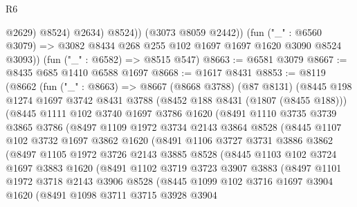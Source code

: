 \begin{lexlean}{R6}
\begin{coremodule}
                  @2629)
                @8524)
              @2634)
            @8524))
        (@3073 @8059 @2442))
      (fun ("_" : @6560 @3079) => @3082 @8434 @268 @255 @102 @1697 @1697 @1620 @3090 @8524 @3093))
    (fun ("_" : @6582) => @8515 @547)
@8663 := @6581 @3079
@8667 := @8435 @685 @1410 @6588 @1697
@8668 := @1617 @8431
@8853 := @8119
    (@8662
      (fun ("_" : @8663) =>
      @8667
        (@8668 @3788)
        (@87 @8131)
        (@8445
          @198
          @1274
          @1697
          @3742
          @8431
          @3788
          (@8452 @188 @8431 (@1807 (@8455 @188)))
          (@8445
            @1111
            @102
            @3740
            @1697
            @3786
            @1620
            (@8491
              @1110
              @3735
              @3739
              @3865
              @3786
              (@8497
                @1109
                @1972
                @3734
                @2143
                @3864
                @8528
                (@8445
                  @1107
                  @102
                  @3732
                  @1697
                  @3862
                  @1620
                  (@8491
                    @1106
                    @3727
                    @3731
                    @3886
                    @3862
                    (@8497
                      @1105
                      @1972
                      @3726
                      @2143
                      @3885
                      @8528
                      (@8445
                        @1103
                        @102
                        @3724
                        @1697
                        @3883
                        @1620
                        (@8491
                          @1102
                          @3719
                          @3723
                          @3907
                          @3883
                          (@8497
                            @1101
                            @1972
                            @3718
                            @2143
                            @3906
                            @8528
                            (@8445
                              @1099
                              @102
                              @3716
                              @1697
                              @3904
                              @1620
                              (@8491
                                @1098
                                @3711
                                @3715
                                @3928
                                @3904

\end{coremodule}
\end{lexlean}

